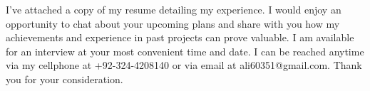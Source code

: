 \documentclass[11pt, a4paper]{awesome-cv}
\begin{document}
\begin{cvletter}
I’ve attached a copy of my resume detailing my experience. I would enjoy an opportunity to chat about your upcoming plans and share with you how my achievements and experience in past projects can prove valuable. I am available for an interview at your most convenient time and date. I can be reached anytime via my cellphone at +92-324-4208140 or via email at ali60351@gmail.com. Thank you for your consideration.


\end{cvletter}


\makeletterclosing
\end{document}
